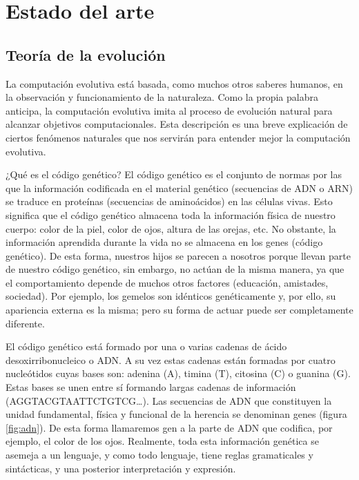 \chapter{Estado del arte}\label{ch:estado-arte}

\section{Teoría de la evolución}

La computación evolutiva está basada, como muchos otros saberes humanos, en la
observación y funcionamiento de la naturaleza. Como la propia palabra anticipa,
la computación evolutiva imita al proceso de evolución natural para alcanzar
objetivos computacionales. Esta descripción es una breve explicación de ciertos
fenómenos naturales que nos servirán para entender mejor la computación
evolutiva.

¿Qué es el código genético?  El código genético es el conjunto de normas por las que la información codificada
en el material genético (secuencias de ADN o ARN) se traduce en proteínas (secuencias de aminoácidos) en las
células vivas. Esto significa que el código genético almacena toda la información física de nuestro cuerpo:
color de la piel, color de ojos, altura de las orejas, etc. No obstante, la información aprendida durante la
vida no se almacena en los genes (código genético). De esta forma, nuestros hijos se parecen a nosotros porque
llevan parte de nuestro código genético, sin embargo, no actúan de la misma manera, ya que el comportamiento
depende de muchos otros factores (educación, amistades, sociedad). Por ejemplo, los gemelos son idénticos
genéticamente y, por ello, su apariencia externa es la misma; pero su forma de actuar puede ser completamente
diferente.

El código genético está formado por una o varias cadenas de ácido
desoxirribonucleico o ADN. A su vez estas cadenas están formadas por cuatro
nucleótidos cuyas bases son: adenina (A), timina (T), citosina (C) o guanina (G).
Estas bases se unen entre sí formando largas cadenas de información
(AGGTACGTAATTCTGTCG…). Las secuencias de ADN que constituyen la unidad
fundamental, física y funcional de la herencia se denominan genes (figura
\ref{fig:adn}). De esta forma llamaremos gen a la parte de ADN que codifica, por
ejemplo, el color de los ojos. Realmente, toda esta información genética se asemeja a un lenguaje, y como todo
lenguaje, tiene reglas gramaticales y sintácticas, y una posterior interpretación
y expresión.

